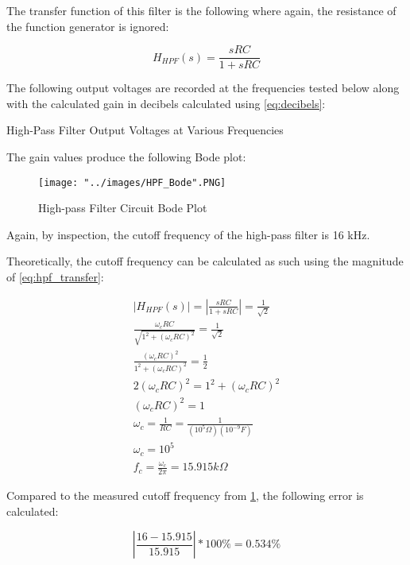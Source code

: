 The transfer function of this filter is the following where again, the resistance of the function generator is ignored:

\begin{equation}
\label{eq:hpf_transfer}
H_{HPF}(s) = \frac{sRC}{1+sRC}
\end{equation}

The following output voltages are recorded at the frequencies tested below along with the calculated gain in decibels calculated using \ref{eq:decibels}:

\FloatBarrier

\begin{table}[h!]
	\centering
	\caption{High-Pass Filter Output Voltages at Various Frequencies}
	\label{tab:hpf_vout}
\end{table}

\FloatBarrier

The gain values produce the following Bode plot:

\FloatBarrier

\begin{figure}[h!]
	\centering
	\texttt{[image: "../images/HPF\_Bode".PNG]}
	\caption{High-pass Filter Circuit Bode Plot}
	\label{fig:HPF_Bode}
\end{figure}

\FloatBarrier

Again, by inspection, the cutoff frequency of the high-pass filter is 16 kHz.

Theoretically, the cutoff frequency can be calculated as such using the magnitude of \ref{eq:hpf_transfer}:

\begin{equation}
\label{eq:hpf_cutoff}
\begin{gathered}
|H_{HPF}(s)| = |\frac{sRC}{1+sRC}| = \frac{1}{\sqrt{2}}\\
\frac{\omega_{c}RC}{\sqrt{1^2 + (\omega_{c} RC)^2}} = \frac{1}{\sqrt{2}}\\
\frac{(\omega_{c}RC)^2}{1^2 + (\omega_{c} RC)^2} = \frac{1}{2}\\
2(\omega_{c} RC)^2 = 1^2 + (\omega_{c} RC)^2\\
(\omega_{c} RC)^2 = 1\\
\omega_{c} = \frac{1}{RC} = \frac{1}{(10^5 \Omega)(10^{-9} F)}\\
\omega_{c} = 10^5\\
f_{c}  = \frac{\omega_{c}}{2\pi} = 15.915 k\Omega
\end{gathered}
\end{equation}

Compared to the measured cutoff frequency from \ref{fig:HPF_Bode}, the following error is calculated:

\begin{equation}
\label{eq:lpf_cutoff_error}
|\frac{16 - 15.915}{15.915}| * 100\% = 0.534\%
\end{equation}
